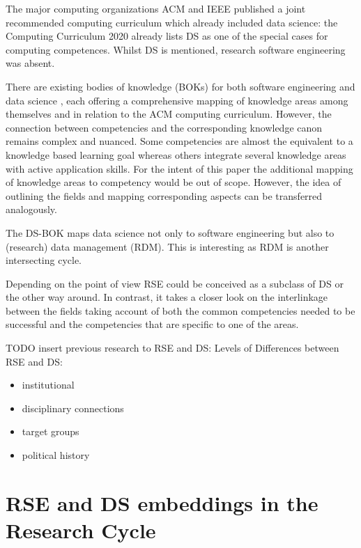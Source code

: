 \documentclass[
        english,biblatex
    ]{lni}
\providecommand{\tightlist}{%
    \setlength{\itemsep}{0pt}\setlength{\parskip}{0pt}}
\begin{document}
    The major computing organizations ACM and IEEE published a joint
    recommended computing curriculum which already included data
    science: the Computing Curriculum 2020 \autocite{CC2020} already
    lists DS as one of the special cases for computing competences.
    Whilst DS is mentioned, research software engineering was absent.

    There are existing bodies of knowledge (BOKs) for both software
    engineering \autocite{SWEBOK2014} and data science
    \autocite{DSBOK2017}, each offering a comprehensive mapping of
    knowledge areas among themselves and in relation to the ACM
    computing curriculum. However, the connection between competencies
    and the corresponding knowledge canon remains complex and nuanced.
    Some competencies are almost the equivalent to a knowledge based
    learning goal whereas others integrate several knowledge areas with
    active application skills. For the intent of this paper the
    additional mapping of knowledge areas to competency would be out of
    scope. However, the idea of outlining the fields and mapping
    corresponding aspects can be transferred analogously.

    The DS-BOK maps data science not only to software engineering but
    also to (research) data management (RDM). This is interesting as RDM
    is another intersecting cycle.

    Depending on the point of view RSE could be conceived as a subclass
    of DS or the other way around. In contrast, it takes a closer look
    on the interlinkage between the fields taking account of both the
    common competencies needed to be successful and the competencies
    that are specific to one of the areas.

    TODO insert previous research to RSE and DS: Levels of Differences
    between RSE and DS:

    \begin{itemize}
    \tightlist
    \item
      institutional
    \item
      disciplinary connections
    \item
      target groups
    \item
      political history
    \end{itemize}

    \section{RSE and DS embeddings in the Research
    Cycle}\label{rse-and-ds-embeddings-in-the-research-cycle}
\end{document}
